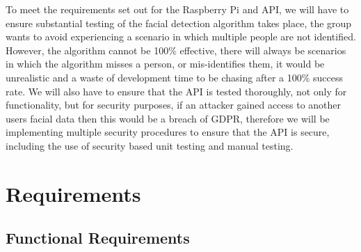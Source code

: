 \documentclass[
  english,
  a4paper,
,tablecaptionabove
]{scrartcl}
\begin{document}
To meet the requirements set out for the Raspberry Pi and API, we will
have to ensure substantial testing of the facial detection algorithm
takes place, the group wants to avoid experiencing a scenario in which
multiple people are not identified. However, the algorithm cannot be
100\% effective, there will always be scenarios in which the algorithm
misses a person, or mis-identifies them, it would be unrealistic and a
waste of development time to be chasing after a 100\% success rate. We
will also have to ensure that the API is tested thoroughly, not only for
functionality, but for security purposes, if an attacker gained access
to another users facial data then this would be a breach of GDPR,
therefore we will be implementing multiple security procedures to ensure
that the API is secure, including the use of security based unit testing
and manual testing.

\hypertarget{requirements}{%
\section{Requirements}\label{requirements}}

\hypertarget{functional-requirements}{%
\subsection{Functional Requirements}\label{functional-requirements}}
\end{document}
